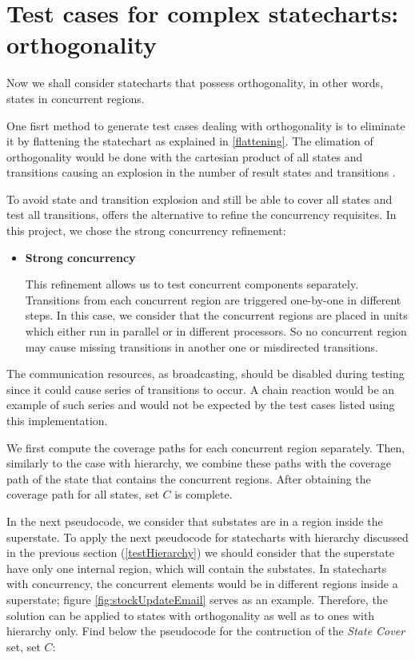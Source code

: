 \section{Test cases for complex statecharts: orthogonality}
\label{testOrthogonality}

Now we shall consider statecharts that possess orthogonality, in other words, states in concurrent regions.

One fisrt method to generate test cases dealing with orthogonality is to eliminate it by flattening the statechart as explained in \ref{flattening}. The elimation of orthogonality would be done with the cartesian product of all states and transitions causing an explosion in the number of result states and transitions \cite{bogdanov}.

To avoid state and transition explosion and still be able to cover all states and test all transitions, \cite{bogdanov} offers the alternative to refine the concurrency requisites. In this project, we chose the strong concurrency refinement:

\begin{itemize}

\item \textbf{Strong concurrency}

This refinement allows us to test concurrent components separately. Transitions from each concurrent region are triggered one-by-one in different steps. In this case, we consider that the concurrent regions are placed in units which either run in parallel or in different processors. So no concurrent region may cause missing transitions in another one or misdirected transitions.
\end{itemize}

The communication resources, as broadcasting, should be disabled during testing since it could cause series of transitions to occur. A chain reaction would be an example of such series and would not be expected by the test cases listed using this implementation.

We first compute the coverage paths for each concurrent region separately. Then, similarly to the case with hierarchy, we combine these paths with the coverage path of the state that contains the concurrent regions. After obtaining the coverage path for all states, set $C$ is complete. 

In the next pseudocode, we consider that substates are in a region inside the superstate. To apply the next pseudocode for statecharts with hierarchy discussed in the previous section (\ref{testHierarchy}) we should consider that the superstate have only one internal region, which will contain the substates. In statecharts with concurrency, the concurrent elements would be in different regions inside a superstate; figure \ref{fig:stockUpdateEmail} serves as an example. Therefore, the solution can be applied to states with orthogonality as well as to ones with hierarchy only. Find below the pseudocode for the contruction of the \textit{State Cover} set, set $C$:

